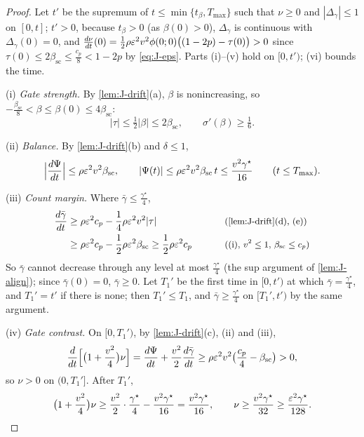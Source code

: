 \begin{proof}
Let $t'$ be the supremum of $t\le\min\{t_\beta,T_{\max}\}$ such that $\nu\ge0$ and $|\Delta_\gamma|\le1$ on $[0,t]$; $t'>0$, because $t_\beta>0$ (as $\beta(0)>0$), $\Delta_\gamma$ is continuous with $\Delta_\gamma(0)=0$, and
$\ddt{\nu}(0)=\frac{1}{2}\rho\initscale^2v^2\phi(0;0)\bigl((1-2p)-\tau(0)\bigr)>0$ since $\tau(0)\le2\beta_{\mathrm{sc}}\le\frac{c_p}{8}<1-2p$ by \cref{eq:J-eps}. Parts (i)--(v) hold on $[0,t')$; (vi) bounds the time.

\smallskip\noindent(i) \emph{Gate strength.} By \cref{lem:J-drift}(a), $\beta$ is nonincreasing, so $-\frac{\beta_{\mathrm{sc}}}{8}<\beta\le \beta(0)\le4\beta_{\mathrm{sc}}$:
\[
 |\tau|\le\tfrac{1}{2}|\beta|\le2\beta_{\mathrm{sc}},\qquad \sigma'(\beta)\ge\tfrac{1}{6}.
\]

\noindent(ii) \emph{Balance.} By \cref{lem:J-drift}(b) and $\delta\le1$,
\[
 \Bigl|\ddt{\Psi}\Bigr|\le\rho\initscale^2v^2\beta_{\mathrm{sc}},\qquad |\Psi(t)|\le\rho\initscale^2v^2\beta_{\mathrm{sc}}\,t\le\frac{v^2\gamma^\star}{16}\qquad(t\le T_{\max}).
\]

\noindent(iii) \emph{Count margin.} Where $\bar\gamma\le\frac{\gamma^\star}{4}$,
\begin{alignat*}{2}
 \ddt{\bar\gamma}&\ge\rho\initscale^2c_p-\tfrac{1}{4}\rho\initscale^2v^2|\tau| &\qquad& \why{\cref{lem:J-drift}(d), (e)}\\
 &\ge\rho\initscale^2c_p-\tfrac{1}{2}\rho\initscale^2\beta_{\mathrm{sc}}\ge\tfrac{1}{2}\rho\initscale^2c_p && \why{(i), $v^2\le1$, $\beta_{\mathrm{sc}}\le c_p$}
\end{alignat*}
So $\bar\gamma$ cannot decrease through any level at most $\frac{\gamma^\star}{4}$ (the sup argument of \cref{lem:J-align}); since $\bar\gamma(0)=0$, $\bar\gamma\ge0$.
Let $T_1'$ be the first time in $[0,t')$ at which $\bar\gamma=\frac{\gamma^\star}{4}$, and $T_1'=t'$ if there is none; then $T_1'\le T_1$, and $\bar\gamma\ge\frac{\gamma^\star}{4}$ on
$[T_1',t')$ by the same argument.

\noindent(iv) \emph{Gate contrast.} On $[0,T_1')$, by \cref{lem:J-drift}(c), (ii) and (iii),
\[
 \frac{d}{dt}\Bigl[\bigl(1+\tfrac{v^2}{4}\bigr)\nu\Bigr]=\ddt{\Psi}+\frac{v^2}{2}\ddt{\bar\gamma}\ge\rho\initscale^2v^2\bigl(\tfrac{c_p}{4}-\beta_{\mathrm{sc}}\bigr)>0,
\]
so $\nu>0$ on $(0,T_1']$. After $T_1'$,
\[
 \bigl(1+\tfrac{v^2}{4}\bigr)\nu\ge\frac{v^2}{2}\cdot\frac{\gamma^\star}{4}-\frac{v^2\gamma^\star}{16}=\frac{v^2\gamma^\star}{16},\qquad \nu\ge\frac{v^2\gamma^\star}{32}\ge\frac{\initscale^2\gamma^\star}{128} .
\]


\end{proof}
